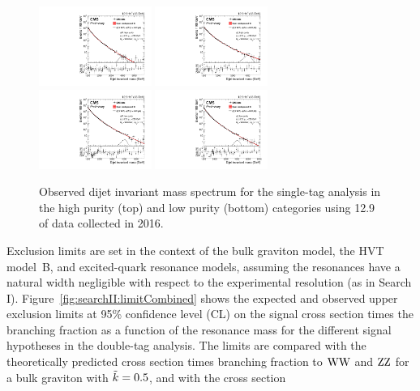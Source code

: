 \begin{figure}[h!]
\centering
\includegraphics[width=0.327\textwidth]{figures/analysis/search2/B2G-16-021/figures/mjj/MLBkgFit_DijetMassHighPuriqW.pdf}
\includegraphics[width=0.327\textwidth]{figures/analysis/search2/B2G-16-021/figures/mjj/MLBkgFit_DijetMassHighPuriqZ.pdf}\\
\includegraphics[width=0.327\textwidth]{figures/analysis/search2/B2G-16-021/figures/mjj/MLBkgFit_DijetMassLowPuriqW.pdf}
\includegraphics[width=0.327\textwidth]{figures/analysis/search2/B2G-16-021/figures/mjj/MLBkgFit_DijetMassLowPuriqZ.pdf}
\caption{Observed dijet invariant mass spectrum for the single-tag analysis in the high purity (top) and low purity (bottom) categories using 12.9 \fbinv of data collected in 2016.}
\label{fig:searchII:doubleobsmqv}
\end{figure}
\noindent Exclusion limits are set in the context of the bulk graviton model, the HVT model~B, and excited-quark resonance models,
assuming the resonances have a natural width negligible with respect to the experimental resolution (as in Search I). Figure~\ref{fig:searchII:limitCombined} shows the expected and observed upper exclusion limits at 95\% confidence level (CL) on the signal cross section times the branching fraction as a function of the resonance mass for the different signal hypotheses in the double-tag analysis. The limits are compared with the theoretically predicted cross section times branching fraction to $\mathrm{W}\mathrm{W}$ and $\mathrm{Z}\mathrm{Z}$ for a bulk graviton with $\tilde{k} = 0.5$, and with the cross section
